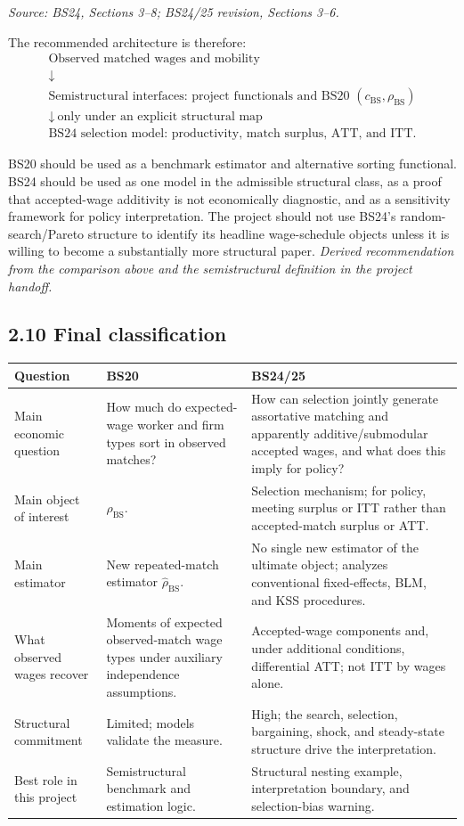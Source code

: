 \documentclass[11pt]{article}
\begin{document}
\textit{Source: BS24, Sections 3--8; BS24/25 revision, Sections 3--6.}

The recommended architecture is therefore:
\[
\boxed{
\begin{array}{c}
\text{Observed matched wages and mobility}\\
\downarrow\\
\text{Semistructural interfaces: project functionals and BS20 }
(c_{\mathrm{BS}},\rho_{\mathrm{BS}})\\
\downarrow\ \text{only under an explicit structural map}\\
\text{BS24 selection model: productivity, match surplus, ATT, and ITT}.
\end{array}
}
\tag{T2.17}
\]

BS20 should be used as a benchmark estimator and alternative sorting
functional.  BS24 should be used as one model in the admissible structural
class, as a proof that accepted-wage additivity is not economically
diagnostic, and as a sensitivity framework for policy interpretation.  The
project should not use BS24's random-search/Pareto structure to identify its
headline wage-schedule objects unless it is willing to become a substantially
more structural paper.
\textit{Derived recommendation from the comparison above and the
semistructural definition in the project handoff.}

\subsection{2.10 Final classification}

\begin{longtable}{p{}p{}p{}}
\textbf{Question} & \textbf{BS20} & \textbf{BS24/25} \\
\hline
Main economic question & How much do expected-wage worker and firm types sort
in observed matches? & How can selection jointly generate assortative matching
and apparently additive/submodular accepted wages, and what does this imply
for policy? \\
Main object of interest & \(\rho_{\mathrm{BS}}\). & Selection mechanism;
for policy, meeting surplus or ITT rather than accepted-match surplus or ATT. \\
Main estimator & New repeated-match estimator
\(\widehat\rho_{\mathrm{BS}}\). & No single new estimator of the ultimate
object; analyzes conventional fixed-effects, BLM, and KSS procedures. \\
What observed wages recover & Moments of expected observed-match wage types
under auxiliary independence assumptions. & Accepted-wage components and,
under additional conditions, differential ATT; not ITT by wages alone. \\
Structural commitment & Limited; models validate the measure. & High; the
search, selection, bargaining, shock, and steady-state structure drive the
interpretation. \\
Best role in this project & Semistructural benchmark and estimation logic. &
Structural nesting example, interpretation boundary, and selection-bias
warning. \\
\end{longtable}
\end{document}
